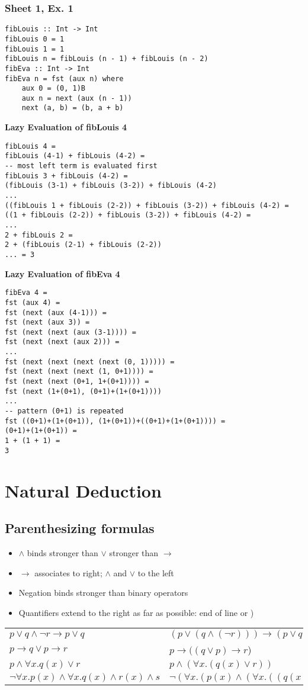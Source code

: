 \documentclass[12pt]{article}
\def\li{\rightarrow}
\def\fax{\forall x.}
\begin{document}
\subsubsection{Sheet 1, Ex. 1}
\begin{verbatim}
fibLouis :: Int -> Int
fibLouis 0 = 1
fibLouis 1 = 1
fibLouis n = fibLouis (n - 1) + fibLouis (n - 2)
fibEva :: Int -> Int
fibEva n = fst (aux n) where 
    aux 0 = (0, 1)B
    aux n = next (aux (n - 1))
    next (a, b) = (b, a + b)
\end{verbatim}
\textbf{Lazy Evaluation of fibLouis 4}
\begin{verbatim}
fibLouis 4 =
fibLouis (4-1) + fibLouis (4-2) =
-- most left term is evaluated first
fibLouis 3 + fibLouis (4-2) =
(fibLouis (3-1) + fibLouis (3-2)) + fibLouis (4-2) 
...
((fibLouis 1 + fibLouis (2-2)) + fibLouis (3-2)) + fibLouis (4-2) =
((1 + fibLouis (2-2)) + fibLouis (3-2)) + fibLouis (4-2) =
...
2 + fibLouis 2 =
2 + (fibLouis (2-1) + fibLouis (2-2))
... = 3
\end{verbatim}
\textbf{Lazy Evaluation of fibEva 4}
\begin{verbatim}
fibEva 4 =
fst (aux 4) =
fst (next (aux (4-1))) =
fst (next (aux 3)) =
fst (next (next (aux (3-1)))) =
fst (next (next (aux 2))) =
...
fst (next (next (next (next (0, 1))))) =
fst (next (next (next (1, 0+1)))) =
fst (next (next (0+1, 1+(0+1)))) =
fst (next (1+(0+1), (0+1)+(1+(0+1)))) 
...
-- pattern (0+1) is repeated
fst ((0+1)+(1+(0+1)), (1+(0+1))+((0+1)+(1+(0+1)))) =
(0+1)+(1+(0+1)) =
1 + (1 + 1) =
3
\end{verbatim}

\section{Natural Deduction}
\subsection{Parenthesizing formulas} 
\begin{itemize}
    \item $\land$ binds stronger than $\lor$ stronger than $\li$
    \item $\li$ associates to right; $\land$ and $\lor$ to the left
    \item Negation binds stronger than binary operators 
    \item Quantifiers extend to the right as far as possible: end of line or )
\end{itemize}
\begin{tabular}{l l}
    $p \lor q \land \lnot r \li p \lor q$ & $(p \lor (q \land (\lnot r))) \li (p \lor q)$ \\
    $p \li q \lor p \li r$ & $p \li ((q \lor p) \li r$) \\
    $p \land \fax q(x) \lor r$ & $p \land (\fax (q(x) \lor r))$ \\
    $\lnot \fax p(x) \land \fax q(x) \land r(x) \land s$ &  $\lnot( \fax (p(x) \land (\fax ((q(x) \land r(x)) \land s))))$
\end{tabular} 
\end{document}
